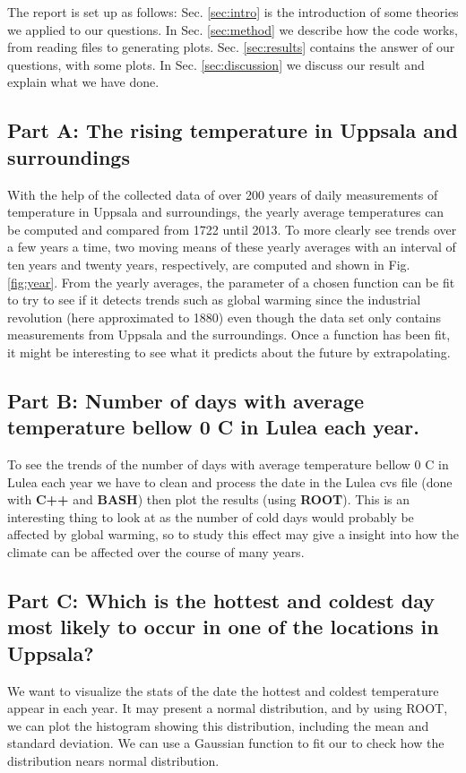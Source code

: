 \documentclass[a4paper]{article}
\begin{document}
The report is set up as follows: Sec. \ref{sec:intro} is the introduction of some theories we applied to our questions. In Sec. \ref{sec:method}  we describe how the code works, from reading files to generating plots. Sec. \ref{sec:results} contains the answer of our questions, with some plots. In Sec. \ref{sec:discussion} we discuss our result and explain what we have done.

\subsection{Part A: The rising temperature in Uppsala and surroundings}
With the help of the collected data of over 200 years of daily measurements of temperature in Uppsala and surroundings, the yearly average temperatures can be computed and compared from 1722 until 2013. To more clearly see trends over a few years a time, two moving means of these yearly averages with an interval of ten years and twenty years, respectively, are computed and shown in Fig.\ref{fig:year}.  From the yearly averages, the parameter of a chosen function can be fit to try to see if it detects trends such as global warming since the industrial revolution (here approximated to 1880) even though the data set only contains measurements from Uppsala and the surroundings. Once a function has been fit, it might be interesting to see what it predicts about the future by extrapolating.
\subsection{Part B: Number of days with average temperature bellow 0 C \degree in Lulea each year.} 
To see the trends of the number of days with average temperature bellow 0 C \degree in Lulea each year we have to clean and process the date in the Lulea cvs file (done with \textbf{C++} and \textbf{BASH}) then plot the results (using \textbf{ROOT}). This is an interesting thing to look at as the number of cold days would probably be affected by global warming, so to study this effect may give a insight into how the climate can be affected over the course of many years.

\subsection{Part C: Which is the hottest and coldest day most likely to occur in one of the locations in Uppsala?}
We want to visualize the stats of the date the hottest and coldest temperature appear in each year. It may present a normal distribution, and by using ROOT, we can plot the histogram showing this distribution, including the mean and standard deviation. We can use a Gaussian function to fit our to check how the distribution nears normal distribution. 
\end{document}
